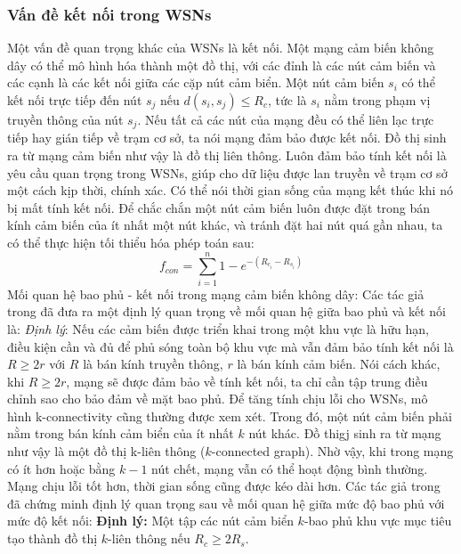 \documentclass{article}
\begin{document}
\subsubsection{Vấn đề kết nối trong \gls{WSNs}}
Một vấn đề quan trọng khác của \gls{WSNs} là kết nối. Một mạng cảm biến không dây có thể mô hình hóa thành một đồ thị, với các đỉnh là các nút cảm biến và các cạnh là các kết nối giữa các cặp nút cảm biển. Một nút cảm biến $s_i$ có thể kết nối trực tiếp đến nút $s_j$ nếu $d(s_i, s_j)\leq R_c $, tức là $s_i$ nằm trong phạm vị truyền thông của nút $s_j$. Nếu tất cả các nút của mạng đều có thể liên lạc trực tiếp hay gián tiếp về trạm cơ sở, ta nói mạng đảm bảo được kết nối. Đồ thị sinh ra từ mạng cảm biến như vậy là đồ thị liên thông. 
\newline Luôn đảm bảo tính kết nối là yêu cầu quan trọng trong \gls{WSNs}, giúp cho dữ liệu được lan truyền về trạm cơ sở một cách kịp thời, chính xác. Có thể nói thời gian sống của mạng kết thúc khi nó bị mất tính kết nối. Để chắc chắn một nút cảm biến luôn được đặt trong bán kính cảm biến của ít nhất một nút khác, và tránh đặt hai nút quá gần nhau, ta có thể thực hiện tối thiểu hóa phép toán sau:
\begin{equation*}
    f_{con} = \sum_{i=1}^n 1-e^{-(R_{c_i}-R_{s_i})}
\end{equation*}
Mối quan hệ bao phủ - kết nối trong mạng cảm biến không dây: Các tác giả trong \cite{zhang2005maintaining} đã đưa ra một định lý quan trọng về mối quan hệ giữa bao phủ và kết nối là: 
\newline \emph{Định lý}: Nếu các cảm biến được triển khai trong một khu vực là hữu hạn, điều kiện cần và đủ để phủ sóng toàn bộ khu vực mà vẫn đảm bảo tính kết nối là  $ R\geq 2r$ với $R$ là bán kính truyền thông, $r$ là bán kính cảm biến. Nói cách khác, khi $ R\geq 2r$, mạng sẽ được đảm bảo về tính kết nối, ta chỉ cần tập trung điều chỉnh sao cho bảo đảm về mặt bao phủ.
\newline Để tăng tính chịu lỗi cho \gls{WSNs}, mô hình k-connectivity cũng thường được xem xét. Trong đó, một nút cảm biến phải nằm trong bán kính cảm biển của ít nhất $k$ nút khác. Đồ thigj sinh ra từ mạng như vậy là một đồ thị k-liên thông ($k$-connected graph). Nhờ vậy, khi trong mạng có ít hơn hoặc bằng $k-1$ nút chết, mạng vẫn có thể hoạt động bình thường. Mạng chịu lỗi tốt hơn, thời gian sống cũng được kéo dài hơn. 
\newline Các tác giả trong \cite{tian2005connectivity} đã chứng minh định lý quan trọng sau về mối quan hệ giữa mức độ bao phủ với mức độ kết nối:
\newline \textbf{Định lý: } Một tập các nút cảm biển $k$-bao phủ khu vực mục tiêu tạo thành đồ thị $k$-liên thông nếu $R_c \geq 2R_s$.
\end{document}
